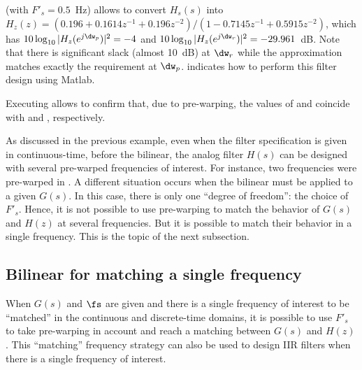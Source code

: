  (with $F'_s=0.5$~Hz) allows to convert $H_s(s)$ into $H_z(z) = (0.196 + 0.1614 z^{-1} +  0.196z^{-2})/(1   -0.7145 z^{-1} +    0.5915 z^{-2})$, which has $10 \log_{10}|H_z(e^{j\dw_p})|^2 = -4$ and 
$10 \log_{10}|H_z(e^{j\dw_r})|^2 = -29.961$~dB. Note that there is significant slack
(almost 10~dB) at $\dw_r$ while the approximation matches exactly the requirement at $\dw_p$.
 indicates how to perform this filter design
using Matlab.


Executing  allows to confirm that, due to pre-warping, the values of
 and  coincide with  and , respectively.
\eExample 

As discussed in the previous example, even when the filter specification is given in continuous-time,
before the bilinear, the analog filter $H(s)$ can be designed with several pre-warped frequencies of interest.
For instance, two frequencies were pre-warped in .
A different situation occurs when the bilinear must be
applied to a given $G(s)$. In this case, there is only one ``degree of freedom'': the choice
of $F'_s$. Hence, it is not possible to use pre-warping to match 
the behavior of $G(s)$ and $H(z)$ at several frequencies. But it is possible to match
their behavior in a single frequency. This is the topic of the next subsection.

\subsection{Bilinear for matching a single frequency}

When $G(s)$ and $\fs$ are given and there is a single frequency of interest to be ``matched'' in the continuous and discrete-time domains, it is possible to use $F'_s$ to take pre-warping in account and reach a matching between $G(s)$ and $H(z)$.
This ``matching'' frequency strategy can also be used to design IIR filters when there is a single frequency of interest.

